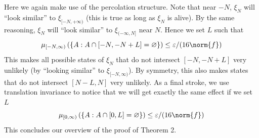\documentclass{scrartcl}
\begin{document}
Here we again make use of the percolation structure. Note that near $-N$, $\xi_N$ will ``look similar'' to $\xi_{[-N, +\infty)}$ (this is true as long as $\xi_N$ is alive). By the same reasoning, $\xi_N$ will ``look similar'' to $\xi_{(-\infty, N]}$ near $N$.
Hence we set $L$ such that
    \[
        \mu_{[-N, \infty)}\left( \left\{ A : A \cap [-N,-N+L] = \varnothing \right\} \right)  \leq \varepsilon/(16\norm{f})
    \]
This makes all possible states of $\xi_N$ that do not intersect $[-N, -N+L]$ very unlikely (by ``looking similar'' to $\xi_{[-N, \infty)}$). By symmetry, this also makes states
that do not intersect $[N-L, N]$ very unlikely. As a final stroke, we use translation invariance to notice that we will get exactly the same effect if we set $L$ 
    \[
        \mu_{[0, \infty)}\left( \left\{ A : A \cap [0,L] = \varnothing \right\} \right) \leq \varepsilon/(16\norm{f})
    \]
This concludes our overview of the proof of Theorem 2.

\printbibliography
        
\end{document}
